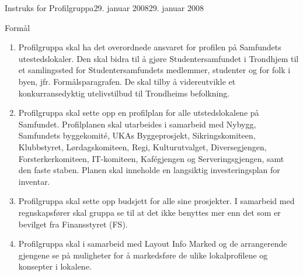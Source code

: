 
\begin{instruks}{Instruks for Profilgruppa}{29. januar 2008}{29. januar 2008}

    \begin{instruksledd}{Formål}
        \begin{enumerate}
            \item Profilgruppa skal ha det overordnede ansvaret for profilen på Samfundets utestedslokaler. Den skal bidra til å
gjøre Studentersamfundet i Trondhjem til et samlingssted for Studentersamfundets medlemmer, studenter og
for folk i byen, jfr. Formålsparagrafen. De skal tilby å videreutvikle et konkurransedyktig utelivstilbud til
Trondheims befolkning.
            \item  Profilgruppa skal sette opp en profilplan for alle utstedslokalene på Samfundet. Profilplanen skal utarbeides i
samarbeid med Nybygg, Samfundets byggekomité, UKAs Byggeprosjekt, Sikringskomiteen, Klubbstyret,
Lørdagskomiteen, Regi, Kulturutvalget, Diversegjengen, Forsterkerkomiteen, IT-komiteen, Kafégjengen og
Serveringsgjengen, samt den faste staben. Planen skal inneholde en langsiktig investeringsplan for inventar.
            \item Profilgruppa skal sette opp budsjett for alle sine prosjekter. I samarbeid med regnskapsfører skal gruppa se til
at det ikke benyttes mer enn det som er bevilget fra Finansstyret (FS).
            \item Profilgruppa skal i samarbeid med Layout Info Marked og de arrangerende gjengene se på muligheter for å
markedsføre de ulike lokalprofilene og konsepter i lokalene.
        \end{enumerate}
    \end{instruksledd}


\end{instruks}
